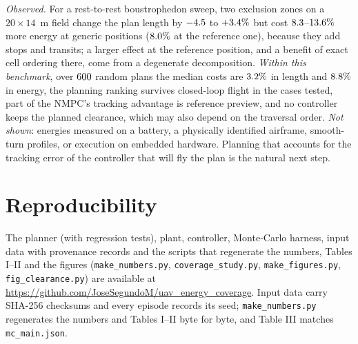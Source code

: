 \documentclass[\PAPERCLASSOPT]{IEEEtran}
\newcommand{\code}[1]{\texttt{\small #1}}
\begin{document}
\emph{Observed.} For a rest-to-rest boustrophedon sweep, two exclusion zones
on a $20\times14$~m field change the plan length by $-4.5$ to
$+3.4\%$ but cost $8.3$--$13.6\%$ more energy at generic
positions ($8.0\%$ at the reference one), because they
add stops and transits; a larger effect at the reference position, and a
benefit of exact cell ordering there, come from a degenerate decomposition.
\emph{Within this benchmark}, over $600$ random plans the median costs are
$3.2\%$ in length and $8.8\%$ in energy, the planning ranking
survives closed-loop flight in the cases tested, part of the NMPC's tracking
advantage is reference preview, and no controller keeps the planned clearance,
which may also depend on the traversal order. \emph{Not shown}: energies measured on
a battery, a physically identified airframe, smooth-turn profiles, or
execution on embedded hardware. Planning that accounts for the tracking error
of the controller that will fly the plan is the natural next step.

\section*{Reproducibility}

The planner (with regression tests), plant, controller, Monte-Carlo harness,
input data with provenance records and the scripts that regenerate the numbers,
Tables I--II and the figures (\code{make\_numbers.py},
\code{coverage\_study.py}, \code{make\_figures.py}, \code{fig\_clearance.py})
are available at \url{https://github.com/JoseSegundoM/uav_energy_coverage}.
Input data carry SHA-256
checksums and every episode records its seed; \code{make\_numbers.py}
regenerates the numbers and Tables I--II byte for byte, and Table III matches
\code{mc\_main.json}.



\end{document}
